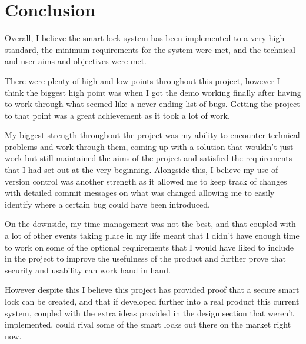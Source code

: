 \chapter{Conclusion}
\label{chap:conclusion}

Overall, I believe the smart lock system has been implemented to a very high standard, the minimum requirements for the system were met, and the technical and user aims and objectives were met.

There were plenty of high and low points throughout this project, however I think the biggest high point was when I got the demo working finally after having to work through what seemed like a never ending list of bugs. Getting the project to that point was a great achievement as it took a lot of work.

My biggest strength throughout the project was my ability to encounter technical problems and work through them, coming up with a solution that wouldn't just work but still maintained the aims of the project and satisfied the requirements that I had set out at the very beginning. Alongside this, I believe my use of version control was another strength as it allowed me to keep track of changes with detailed commit messages on what was changed allowing me to easily identify where a certain bug could have been introduced.

On the downside, my time management was not the best, and that coupled with a lot of other events taking place in my life meant that I didn't have enough time to work on some of the optional requirements that I would have liked to include in the project to improve the usefulness of the product and further prove that security and usability can work hand in hand.

However despite this I believe this project has provided proof that a secure smart lock can be created, and that if developed further into a real product this current system, coupled with the extra ideas provided in the design section that weren't implemented, could rival some of the smart locks out there on the market right now.